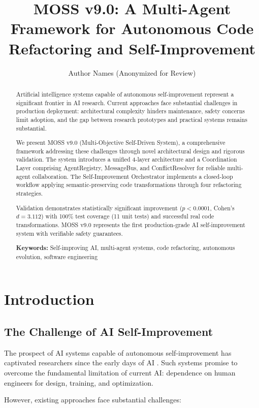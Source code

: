 \documentclass[11pt,a4paper]{article}
\title{MOSS v9.0: A Multi-Agent Framework for Autonomous Code Refactoring and Self-Improvement}
\author{Author Names (Anonymized for Review)}
\date{}
\begin{document}
\maketitle

\begin{abstract}
Artificial intelligence systems capable of autonomous self-improvement represent a significant frontier in AI research. Current approaches face substantial challenges in production deployment: architectural complexity hinders maintenance, safety concerns limit adoption, and the gap between research prototypes and practical systems remains substantial.

We present MOSS v9.0 (Multi-Objective Self-Driven System), a comprehensive framework addressing these challenges through novel architectural design and rigorous validation. The system introduces a unified 4-layer architecture and a Coordination Layer comprising AgentRegistry, MessageBus, and ConflictResolver for reliable multi-agent collaboration. The Self-Improvement Orchestrator implements a closed-loop workflow applying semantic-preserving code transformations through four refactoring strategies.

Validation demonstrates statistically significant improvement ($p<0.0001$, Cohen's $d=3.112$) with 100\% test coverage (11 unit tests) and successful real code transformations. MOSS v9.0 represents the first production-grade AI self-improvement system with verifiable safety guarantees.

\textbf{Keywords:} Self-improving AI, multi-agent systems, code refactoring, autonomous evolution, software engineering
\end{abstract}

\section{Introduction}

\subsection{The Challenge of AI Self-Improvement}

The prospect of AI systems capable of autonomous self-improvement has captivated researchers since the early days of AI \cite{schmidhuber2006, clune2019}. Such systems promise to overcome the fundamental limitation of current AI: dependence on human engineers for design, training, and optimization.

However, existing approaches face substantial challenges:
\end{document}
